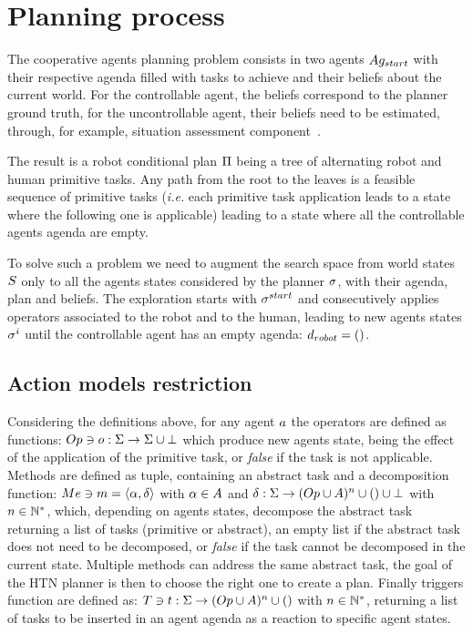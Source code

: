 \documentclass[a4paper,11pt,twoside]{StyleThese}
\begin{document}
\section{Planning process}
The cooperative agents planning problem consists in two agents $Ag_{start}$ with their respective agenda filled with tasks to achieve and their beliefs about the current world. For the controllable agent, the beliefs correspond to the planner ground truth, for the uncontrollable agent, their beliefs need to be estimated, through, for example, situation assessment component~\cite{milliez2014framework, lemaignan2018underworlds}.

The result is a robot conditional plan $\Pi$ being a tree of alternating robot and human primitive tasks. Any path from the root to the leaves is a feasible sequence of primitive tasks (\textit{i.e.} each primitive task application leads to a state where the following one is applicable) leading to a state where all the controllable agents agenda are empty.

To solve such a problem we need to augment the search space from world states $S$ only to all the agents states considered by the planner $\sigma$, with their agenda, plan and beliefs. The exploration starts with $\sigma^{start}$ and consecutively applies operators associated to the robot and to the human, leading to new agents states $\sigma^{i}$ until the controllable agent has an empty agenda: $d_{robot} = ()$.

\subsection{Action models restriction}
Considering the definitions above, for any agent $a$ the operators are defined as functions: $Op \ni o: \Sigma \rightarrow \Sigma \cup \bot$ which produce new agents state, being the effect of the application of the primitive task, or \textit{false} if the task is not applicable.
Methods are defined as tuple, containing an abstract task and a decomposition function: $Me \ni m = \langle \alpha, \delta \rangle$ with $\alpha \in A$ and $\delta: \Sigma \rightarrow (Op \cup A)^n \cup () \cup \bot$ with $n \in \mathbb{N}^*$, which, depending on agents states, decompose the abstract task returning a list of tasks (primitive or abstract), an empty list if the abstract task does not need to be decomposed, or \textit{false} if the task cannot be decomposed in the current state. Multiple methods can address the same abstract task, the goal of the HTN planner is then to choose the right one to create a plan.
Finally triggers function are defined as: $T \ni t: \Sigma \rightarrow (Op \cup A)^n \cup ()$ with $n \in \mathbb{N}^*$, returning a list of tasks to be inserted in an agent agenda as a reaction to specific agent states. 
\end{document}
